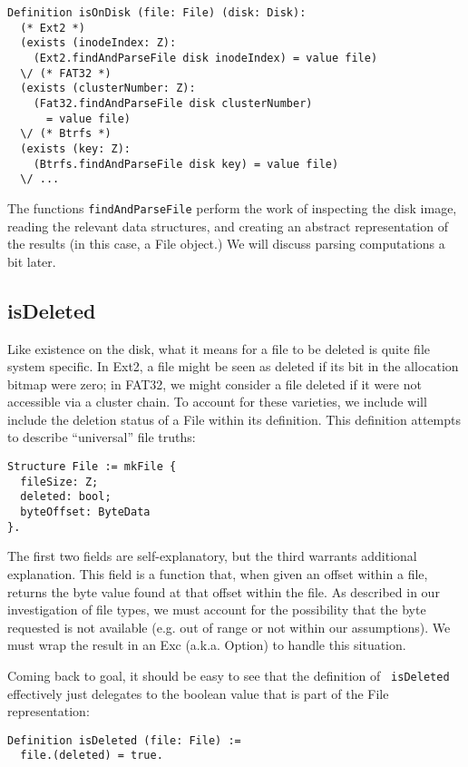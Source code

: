 \documentclass[nocopyrightspace]{sigplanconf}
\begin{document}
\begin{lstlisting}
Definition isOnDisk (file: File) (disk: Disk):
  (* Ext2 *)
  (exists (inodeIndex: Z):
    (Ext2.findAndParseFile disk inodeIndex) = value file)
  \/ (* FAT32 *)
  (exists (clusterNumber: Z):
    (Fat32.findAndParseFile disk clusterNumber) 
      = value file)
  \/ (* Btrfs *)
  (exists (key: Z):
    (Btrfs.findAndParseFile disk key) = value file)
  \/ ...
\end{lstlisting}

The functions {\tt findAndParseFile} perform the work of inspecting the disk
image, reading the relevant data structures, and creating an abstract
representation of the results (in this case, a File object.) We will discuss
parsing computations a bit later.

\subsection{isDeleted}

Like existence on the disk, what it means for a file to be deleted is quite
file system specific. In Ext2, a file might be seen as deleted if its bit in
the allocation bitmap were zero; in FAT32, we might consider a file deleted if
it were not accessible via a cluster chain. To account for these varieties, we
include will include the deletion status of a File within its definition. This
definition attempts to describe ``universal'' file truths:

\begin{lstlisting}
Structure File := mkFile {
  fileSize: Z;
  deleted: bool;
  byteOffset: ByteData
}.
\end{lstlisting}

The first two fields are self-explanatory, but the third warrants additional
explanation. This field is a function that, when given an offset within a
file, returns the byte value found at that offset within the file. As
described in our investigation of file types, we must account for the
possibility that the byte requested is not available (e.g. out of range or not
within our assumptions). We must wrap the result in an Exc (a.k.a. Option) to
handle this situation.

Coming back to goal, it should be easy to see that the definition of {\tt
isDeleted} effectively just delegates to the boolean value that is part of the
File representation:

\begin{lstlisting}
Definition isDeleted (file: File) :=
  file.(deleted) = true.
\end{lstlisting}
\end{document}
